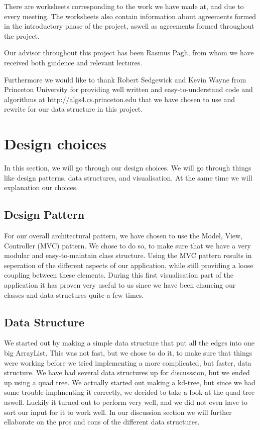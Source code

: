\documentclass[a4paper,11pt]{article}
\begin{document}
There are worksheets corresponding to the work we have made at, and due to every meeting. The worksheets also contain information about agreements formed in the introductory phase of the project, aswell as agreements formed throughout the project.

Our advisor throughout this project has been Rasmus Pagh, from whom we have received both guidence and relevant lectures. 

Furthermore we would like to thank Robert Sedgewick and Kevin Wayne from Princeton University for providing well written and easy-to-understand code and algorithms at http://algs4.cs.princeton.edu that we have chosen to use and rewrite for our data structure in this project.

\pagebreak
\section{Design choices} %
\label{sec:Design choices}
In this section, we will go through our design choices. We will go through things like design patterns, data structures, and visualisation.
At the same time we will explanation our choices.

\subsection{Design Pattern} %
\label{sub:Design Pattern}
For our overall architectural pattern, we have chosen to use the Model, View, Controller (MVC) pattern. We chose to do so, to make sure that we have
a very modular and easy-to-maintain class structure. Using the MVC pattern results in seperation of the different aspects of our application, while still providing a loose coupling between these elements. During this first visualisation part of the application it has proven very useful to us since we
have been chancing our classes and data structures quite a few times.


\subsection{Data Structure} %
\label{sub:Data Structure}
We started out by making a simple data structure that put all the edges into one big ArrayList. This was not fast, but we chose to do it, to make sure that
things were working before we tried implementing a more complicated, but faster, data structure. We have had several data structures up for discusssion, but we ended up using a quad tree. We actually started out making a kd-tree, but since we had some trouble implmenting it correctly, we decided to take a look at
the quad tree aswell. Luckily it turned out to perform very well, and we did not even have to sort our input for it to work well. In our discussion 
section we will further ellaborate on the pros and cons of the different data structures.
\end{document}
